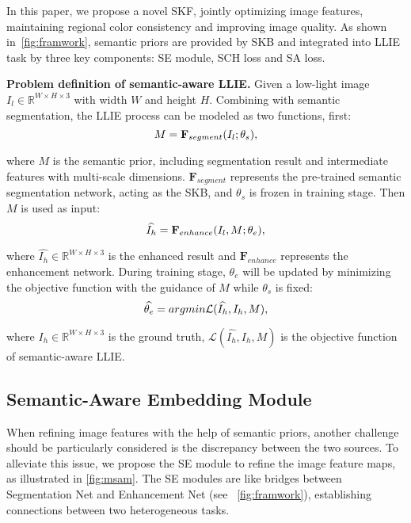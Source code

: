 \documentclass[10pt,twocolumn,letterpaper]{article}
\begin{document}
In this paper, we propose a novel SKF, jointly optimizing image features, maintaining regional color consistency and improving image quality. As shown in~\cref{fig:framwork}, semantic priors are provided by SKB and integrated into LLIE task by three key components: SE module, SCH loss and SA loss. 

\textbf{Problem definition of semantic-aware LLIE.} Given a low-light image $I_l\in\mathbb{R}^{W\times H\times 3}$ with width $W$ and height $H$. Combining with semantic segmentation, the LLIE process can be modeled as two functions, first: 
\vspace{-0.09cm}
\begin{equation}
  M = \mathbf{F}_{segment}(I_{l}; \theta_s),
  \label{eq:def1}
  \vspace{-0.15cm}
\end{equation}

where $M$ is the semantic prior, including segmentation result and intermediate features with multi-scale dimensions. $\mathbf{F}_{segment}$ represents the pre-trained semantic segmentation network, acting as the SKB, and $\theta_s$ is frozen in training stage. Then $M$ is used as input: 
\vspace{-0.09cm}
\begin{equation}
  \widehat{I_{h}} = \mathbf{F}_{enhance}(I_{l}, M; \theta_e),
  \label{eq:def2}
  \vspace{-0.09cm}
\end{equation}

where $\widehat{I_{h}}\in\mathbb{R}^{W\times H\times 3}$ is the enhanced result and $\mathbf{F}_{enhance}$ represents the enhancement network. During training stage, $\theta_e$ will be updated by minimizing the objective function with the guidance of $M$ while $\theta_s$ is fixed:
\vspace{-0.09cm}
\begin{equation}
  \widehat{\theta_e} = argmin\mathcal{L}(\widehat{I_{h}}, I_{h}, M),
  \label{eq:def3}
  \vspace{-0.09cm}
\end{equation}

where $I_{h}\in\mathbb{R}^{W\times H\times 3}$ is the ground truth, $\mathcal{L}(\widehat{I_{h}}, I_{h}, M)$ is the objective function of semantic-aware LLIE.

\vspace{-0.1cm}
\subsection{Semantic-Aware Embedding Module}
\vspace{-0.05cm}
When refining image features with the help of semantic priors, another challenge should be particularly considered is the discrepancy between the two sources. To alleviate this issue, we propose the SE module to refine the image feature maps, as illustrated in \cref{fig:msam}. The SE modules are like bridges between Segmentation Net and Enhancement Net (see ~\cref{fig:framwork}), establishing connections between two heterogeneous tasks.
\end{document}
